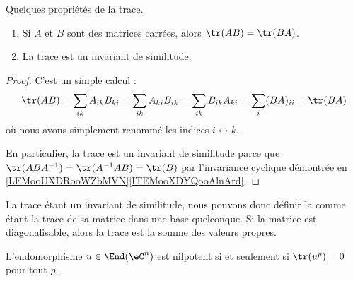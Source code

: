 \begin{lemma}   \label{LemhbZTay}
    Quelques propriétés de la trace.
    \begin{enumerate}
        \item
    Si \( A\) et \( B\) sont des matrices carrées, alors \( \tr(AB)=\tr(BA)\).
\item
    La trace est un invariant de similitude.
    \end{enumerate}
\end{lemma}

\begin{proof}
    C'est un simple calcul :
    \begin{equation}
            \tr(AB)=\sum_{ik}A_{ik}B_{ki}
            =\sum_{ik}A_{ki}B_{ik}
            =\sum_{ik}B_{ik}A_{ki}
            =\sum_i(BA)_{ii}
            =\tr(BA)
    \end{equation}
    où nous avons simplement renommé les indices \( i\leftrightarrow k\).

    En particulier, la trace est un invariant de similitude parce que \( \tr(ABA^{-1})=\tr(A^{-1} AB)=\tr(B)\) par l'invariance cyclique démontrée en \ref{LEMooUXDRooWZbMVN}\ref{ITEMooXDYQooAlnArd}.
\end{proof}
La trace étant un invariant de similitude, nous pouvons donc définir la  comme étant la trace de sa matrice dans une base quelconque. Si la matrice est diagonalisable, alors la trace est la somme des valeurs propres.

\begin{lemma}   \label{LemzgNOjY}
    L'endomorphisme \( u\in\End(\eC^n)\) est nilpotent si et seulement si \( \tr(u^p)=0\) pour tout \( p\).
\end{lemma}


